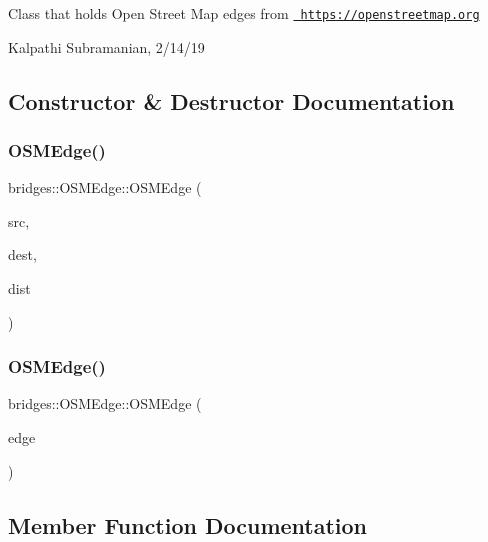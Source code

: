 Class that holds Open Street Map edges from \href{https://openstreetmap.org}{\texttt{ https\+://openstreetmap.\+org}}

Kalpathi Subramanian, 2/14/19 

\subsection{Constructor \& Destructor Documentation}
\mbox{\label{classbridges_1_1_o_s_m_edge_ace6b587439a5c3957f72a9d48e9782eb}} 
\subsubsection{\texorpdfstring{OSMEdge()}{OSMEdge()}\hspace{0.1cm}{\footnotesize\ttfamily [1/2]}}
{\footnotesize\ttfamily bridges\+::\+O\+S\+M\+Edge\+::\+O\+S\+M\+Edge (\begin{DoxyParamCaption}\item[{int}]{src,  }\item[{int}]{dest,  }\item[{double}]{dist }\end{DoxyParamCaption})\hspace{0.3cm}{\ttfamily [inline]}}

\mbox{\label{classbridges_1_1_o_s_m_edge_ab76af0cbc8a84362edc6912e243ff2ef}} 
\subsubsection{\texorpdfstring{OSMEdge()}{OSMEdge()}\hspace{0.1cm}{\footnotesize\ttfamily [2/2]}}
{\footnotesize\ttfamily bridges\+::\+O\+S\+M\+Edge\+::\+O\+S\+M\+Edge (\begin{DoxyParamCaption}\item[{const \mbox{\hyperlink{classbridges_1_1_o_s_m_edge}{O\+S\+M\+Edge}} $\ast$}]{edge }\end{DoxyParamCaption})\hspace{0.3cm}{\ttfamily [inline]}}



\subsection{Member Function Documentation}
\mbox{\label{classbridges_1_1_o_s_m_edge_a6bdd47593d6d0ecd05f516085db98b61}} 
